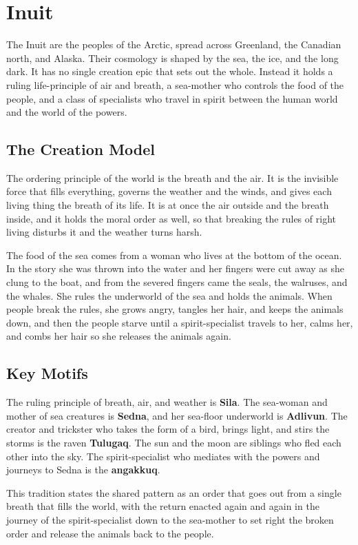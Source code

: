 \section{Inuit}

The Inuit are the peoples of the Arctic, spread across Greenland, the Canadian north, and Alaska. Their cosmology is shaped by the sea, the ice, and the long dark. It has no single creation epic that sets out the whole. Instead it holds a ruling life-principle of air and breath, a sea-mother who controls the food of the people, and a class of specialists who travel in spirit between the human world and the world of the powers.

\subsection{The Creation Model}

The ordering principle of the world is the breath and the air. It is the invisible force that fills everything, governs the weather and the winds, and gives each living thing the breath of its life. It is at once the air outside and the breath inside, and it holds the moral order as well, so that breaking the rules of right living disturbs it and the weather turns harsh.

The food of the sea comes from a woman who lives at the bottom of the ocean. In the story she was thrown into the water and her fingers were cut away as she clung to the boat, and from the severed fingers came the seals, the walruses, and the whales. She rules the underworld of the sea and holds the animals. When people break the rules, she grows angry, tangles her hair, and keeps the animals down, and then the people starve until a spirit-specialist travels to her, calms her, and combs her hair so she releases the animals again.

\subsection{Key Motifs}

The ruling principle of breath, air, and weather is \textbf{Sila}. The sea-woman and mother of sea creatures is \textbf{Sedna}, and her sea-floor underworld is \textbf{Adlivun}. The creator and trickster who takes the form of a bird, brings light, and stirs the storms is the raven \textbf{Tulugaq}. The sun and the moon are siblings who fled each other into the sky. The spirit-specialist who mediates with the powers and journeys to Sedna is the \textbf{angakkuq}.

This tradition states the shared pattern as an order that goes out from a single breath that fills the world, with the return enacted again and again in the journey of the spirit-specialist down to the sea-mother to set right the broken order and release the animals back to the people.
